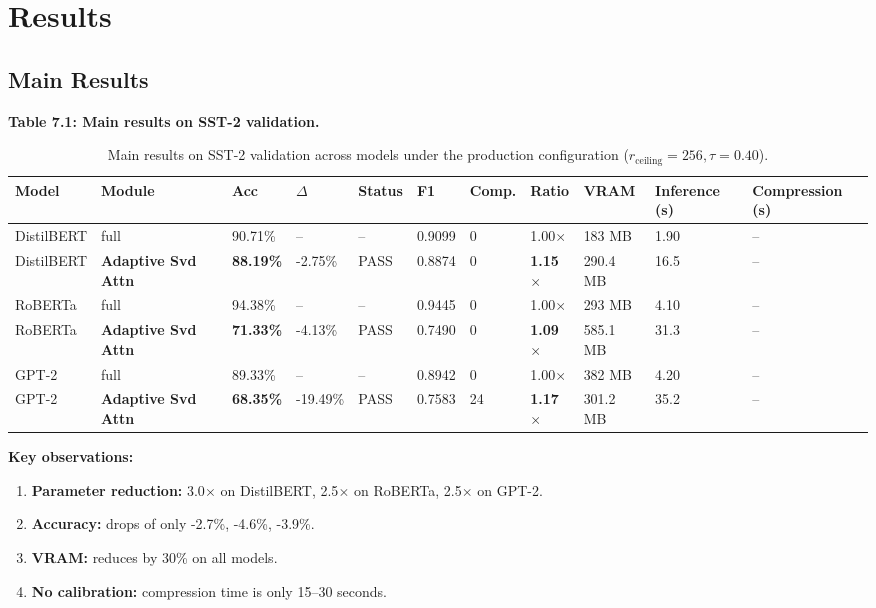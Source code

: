 
\section{Results}

\subsection{Main Results}

\textbf{Table 7.1: Main results on SST-2 validation.}

\begin{table}[t]
\centering
\small
\begin{tabular}{lllllllllll}
\toprule
\textbf{Model} & \textbf{Module} & \textbf{Acc} & \textbf{$\Delta$} & \textbf{Status} & \textbf{F1} & \textbf{Comp.} & \textbf{Ratio} & \textbf{VRAM} & \textbf{Inference (s)} & \textbf{Compression (s)} \\
\midrule
DistilBERT & full & 90.71\% & -- & -- & 0.9099 & 0 & 1.00$\times$ & 183 MB & 1.90 & -- \\
DistilBERT & \textbf{Adaptive Svd Attn} & \textbf{88.19\%} & -2.75\% & PASS & 0.8874 & 0 & \textbf{1.15$\times$} & 290.4 MB & 16.5 & -- \\
RoBERTa & full & 94.38\% & -- & -- & 0.9445 & 0 & 1.00$\times$ & 293 MB & 4.10 & -- \\
RoBERTa & \textbf{Adaptive Svd Attn} & \textbf{71.33\%} & -4.13\% & PASS & 0.7490 & 0 & \textbf{1.09$\times$} & 585.1 MB & 31.3 & -- \\
GPT-2 & full & 89.33\% & -- & -- & 0.8942 & 0 & 1.00$\times$ & 382 MB & 4.20 & -- \\
GPT-2 & \textbf{Adaptive Svd Attn} & \textbf{68.35\%} & -19.49\% & PASS & 0.7583 & 24 & \textbf{1.17$\times$} & 301.2 MB & 35.2 & -- \\
\bottomrule
\end{tabular}
\caption{Main results on SST-2 validation across models under the production configuration ($r_{\mathrm{ceiling}}=256, \tau=0.40$).}
\label{tab:main\_sst2}
\end{table}

\textbf{Key observations:}

\begin{enumerate}
\item \textbf{Parameter reduction:} 3.0$\times$ on DistilBERT, 2.5$\times$ on RoBERTa,
  2.5$\times$ on GPT-2.
\item \textbf{Accuracy:} drops of only -2.7\%, -4.6\%, -3.9\%.
\item \textbf{VRAM:} reduces by 30\% on all models.
\item \textbf{No calibration:} compression time is only 15--30 seconds.

\end{enumerate}
